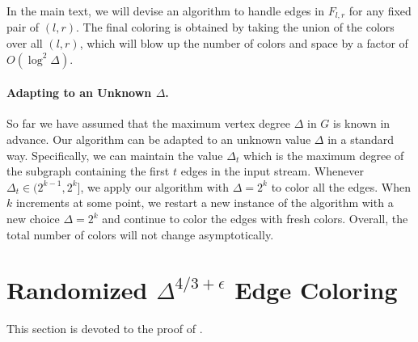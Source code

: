 \documentclass[11pt,a4paper]{article}
\begin{document}
In the main text, we will devise an algorithm to handle edges in $F_{l, r}$ for any fixed pair of $(l, r)$. The final coloring is obtained by taking the union of the colors over all $(l, r)$, which will blow up the number of colors and space by a factor of $O(\log^2\Delta)$.

\paragraph*{Adapting to an Unknown $\Delta$.} So far we have assumed that the maximum vertex degree $\Delta$ in $G$ is known in advance. Our algorithm can be adapted to an unknown value $\Delta$ in a standard way. Specifically, we can maintain the value $\Delta_t$ which is the maximum degree of the subgraph containing the first $t$ edges in the input stream. Whenever $\Delta_t\in (2^{k-1}, 2^{k}]$, we apply our algorithm with $\Delta = 2^k$ to color all the edges. When $k$ increments at some point, we restart a new instance of the algorithm with a new choice $\Delta = 2^k$ and continue to color the edges with fresh colors. Overall, the total number of colors will not change asymptotically. \section{Randomized $\Delta^{4/3+\epsilon}$ Edge Coloring}

This section is devoted to the proof of .
\end{document}
